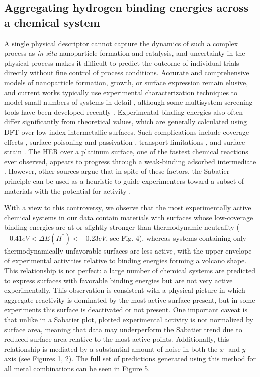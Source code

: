 \documentclass[preprint,12pt]{elsarticle}
\begin{document}
\subsection{Aggregating hydrogen binding energies across a chemical system}
A single physical descriptor cannot capture the dynamics of such a complex process as {\it in situ} nanoparticle formation and catalysis, and uncertainty in the physical process makes it difficult to predict the outcome of individual trials directly without fine control of process conditions. Accurate and comprehensive models of nanoparticle formation, growth, or surface expression remain elusive, and current works typically use experimental characterization techniques to model small numbers of systems in detail \cite{chen2019kinetics,ma2019toward,gamler2019achieving}, although some multisystem screening tools have been developed recently \cite{wahl2021machine,li2019intermetallic,palizhati2019toward}. Experimental binding energies also often differ significantly from theoretical values, which are generally calculated using DFT over low-index intermetallic surfaces. Such complications include coverage effects \cite{frey2014implications}, surface poisoning and passivation \cite{quaino2014volcano}, transport limitations \cite{rheinlander2013comparing}, and surface strain \cite{khorshidi2018strain}. The HER over a platinum surface, one of the fastest chemical reactions ever observed, appears to progress through a weak-binding adsorbed intermediate \cite{lindgren2019challenge,ooka2021non}. However, other sources argue that in spite of these factors, the Sabatier principle can be used as a heuristic to guide experimenters toward a subset of materials with the potential for activity \cite{ulissi2011effect,schipper2018effects}. 

With a view to this controversy, we observe that the most experimentally active chemical systems in our data contain materials with surfaces whose low-coverage binding energies are at or slightly stronger than thermodynamic neutrality ($-0.41 eV < \Delta E(H^*) < -0.23 eV$, see Fig. 4), whereas systems containing only thermodynamically unfavorable surfaces are less active, with the upper envelope of experimental activities relative to binding energies forming a volcano shape. This relationship is not perfect: a large number of chemical systems are predicted to express surfaces with favorable binding energies but are not very active experimentally. This observation is consistent with a physical picture in which aggregate reactivity is dominated by the most active surface present, but in some experiments this surface is deactivated or not present. One important caveat is that unlike in a Sabatier plot, plotted experimental activity is not normalized by surface area, meaning that data may underperform the Sabatier trend due to reduced surface area relative to the most active points. Additionally, this relationship is mediated by a substantial amount of noise in both the $x$- and $y$-axis (see Figures 1, 2). The full set of predictions generated using this method for all metal combinations can be seen in Figure 5.
\end{document}
